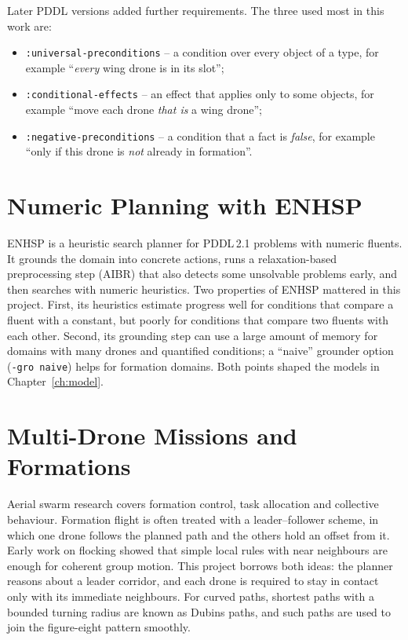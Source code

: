 \documentclass[11pt,a4paper,oneside]{report}
\newcommand{\code}[1]{\texttt{#1}}
\begin{document}
\noindent Later PDDL versions added further requirements. The three used most in this work are:
\begin{itemize}
  \item \code{:universal-preconditions} -- a condition over every object of a type, for example
        ``\emph{every} wing drone is in its slot'';
  \item \code{:conditional-effects} -- an effect that applies only to some objects, for example
        ``move each drone \emph{that is} a wing drone'';
  \item \code{:negative-preconditions} -- a condition that a fact is \emph{false}, for example
        ``only if this drone is \emph{not} already in formation''.
\end{itemize}

\section{Numeric Planning with ENHSP}
ENHSP is a heuristic search planner for PDDL\,2.1 problems with numeric fluents. It grounds the
domain into concrete actions, runs a relaxation-based preprocessing step (AIBR) that also
detects some unsolvable problems early, and then searches with numeric heuristics. Two
properties of ENHSP mattered in this project. First, its heuristics estimate progress well for
conditions that compare a fluent with a constant, but poorly for conditions that compare two
fluents with each other. Second, its grounding step can use a large amount of memory for domains
with many drones and quantified conditions; a ``naive'' grounder option (\code{-gro naive}) helps
for formation domains. Both points shaped the models in Chapter~\ref{ch:model}.

\section{Multi-Drone Missions and Formations}
Aerial swarm research covers formation control, task allocation and collective behaviour.
Formation flight is often treated with a leader--follower scheme, in which one drone follows the
planned path and the others hold an offset from it. Early work on flocking showed that simple
local rules with near neighbours are enough for coherent group motion. This project borrows both
ideas: the planner reasons about a leader corridor, and each drone is required to stay in contact
only with its immediate neighbours. For curved paths, shortest paths with a bounded turning
radius are known as Dubins paths, and such paths are used to join the figure-eight pattern
smoothly.
\end{document}
